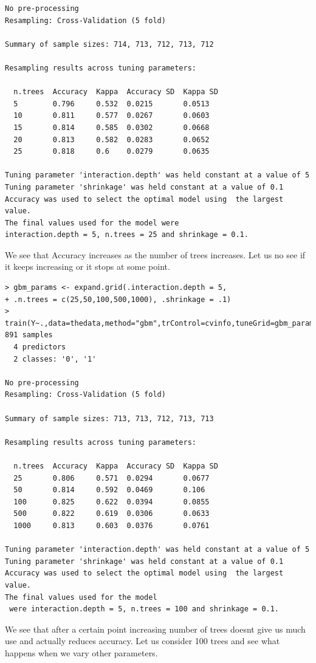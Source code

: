 \documentclass[fontsize=10pt]{scrartcl}
\begin{document}
\begin{enumerate}
\begin{verbatim}
No pre-processing
Resampling: Cross-Validation (5 fold) 

Summary of sample sizes: 714, 713, 712, 713, 712 

Resampling results across tuning parameters:

  n.trees  Accuracy  Kappa  Accuracy SD  Kappa SD
  5        0.796     0.532  0.0215       0.0513  
  10       0.811     0.577  0.0267       0.0603  
  15       0.814     0.585  0.0302       0.0668  
  20       0.813     0.582  0.0283       0.0652  
  25       0.818     0.6    0.0279       0.0635  

Tuning parameter 'interaction.depth' was held constant at a value of 5
Tuning parameter 'shrinkage' was held constant at a value of 0.1
Accuracy was used to select the optimal model using  the largest value.
The final values used for the model were 
interaction.depth = 5, n.trees = 25 and shrinkage = 0.1. 
\end{verbatim}

			We see that Accuracy increases as the number of trees increases. Let us no see if it keeps increasing or it stops at some point.

\begin{verbatim}
> gbm_params <- expand.grid(.interaction.depth = 5,
+ .n.trees = c(25,50,100,500,1000), .shrinkage = .1)
> train(Y~.,data=thedata,method="gbm",trControl=cvinfo,tuneGrid=gbm_params)
891 samples
  4 predictors
  2 classes: '0', '1' 

No pre-processing
Resampling: Cross-Validation (5 fold) 

Summary of sample sizes: 713, 713, 712, 713, 713 

Resampling results across tuning parameters:

  n.trees  Accuracy  Kappa  Accuracy SD  Kappa SD
  25       0.806     0.571  0.0294       0.0677  
  50       0.814     0.592  0.0469       0.106   
  100      0.825     0.622  0.0394       0.0855  
  500      0.822     0.619  0.0306       0.0633  
  1000     0.813     0.603  0.0376       0.0761  

Tuning parameter 'interaction.depth' was held constant at a value of 5
Tuning parameter 'shrinkage' was held constant at a value of 0.1
Accuracy was used to select the optimal model using  the largest value.
The final values used for the model
 were interaction.depth = 5, n.trees = 100 and shrinkage = 0.1. 
\end{verbatim}
			We see that after a certain point increasing number of trees doesnt give us much use and actually reduces accuracy. Let us consider 100 trees and see what happens when we vary other parameters.


\end{enumerate}
\end{document}
